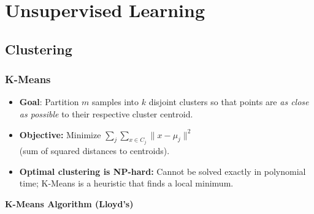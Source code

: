 \section{Unsupervised Learning}

\subsection{Clustering}
\subsubsection{K-Means}
\begin{itemize}
    \item \textbf{Goal}: Partition $m$ samples into $k$ disjoint clusters
          so that points are \emph{as close as possible} to their
          respective cluster centroid.
    \item \textbf{Objective:} Minimize $\sum_j \sum_{x \in C_j} \|x - \mu_j\|^2$ \\
    (sum of squared distances to centroids).
    \item \textbf{Optimal clustering is NP-hard:} Cannot be solved exactly in polynomial time; K-Means is a heuristic that finds a local minimum.
\end{itemize}

\textbf{K-Means Algorithm (Lloyd's)}
\noindent
{}

